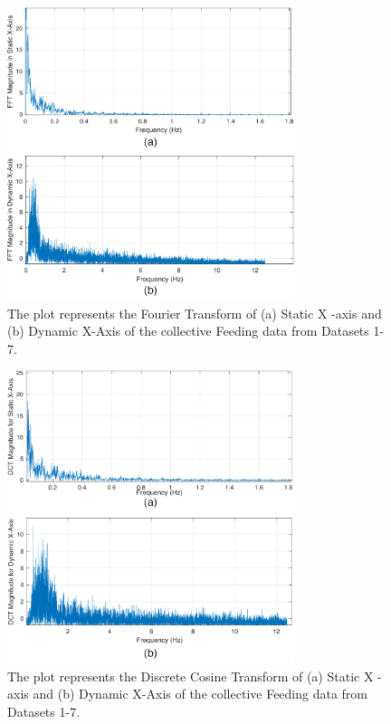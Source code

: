 \documentclass[conference]{IEEEtran}
\begin{document}
\begin{figure}[h!]
	\centering
	\includegraphics[width=3.3in]{fft.pdf}
	\caption{The plot represents the Fourier Transform of (a) Static X -axis and (b) Dynamic X-Axis of the collective Feeding data from Datasets 1-7.}
	\label{fft}
\end{figure}
\begin{figure}[h!]
	\centering
	\includegraphics[width=3.3in]{dct.pdf}
	\caption{The plot represents the Discrete Cosine Transform of (a) Static X -axis and (b) Dynamic X-Axis of the collective Feeding data from Datasets 1-7.}
	\label{dct}
\end{figure}
\end{document}
